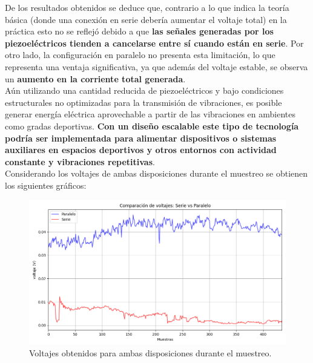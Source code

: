 \documentclass{article}
\begin{document}
De los resultados obtenidos se deduce que, contrario a lo que indica la teoría básica (donde una conexión en serie debería aumentar el voltaje total) en la práctica esto no se reflejó debido a que \textbf{las señales generadas por los piezoeléctricos tienden a cancelarse entre sí cuando están en serie}. Por otro lado, la configuración en paralelo no presenta esta limitación, lo que representa una ventaja significativa, ya que además del voltaje estable, se observa un \textbf{aumento en la corriente total generada}.
\\
Aún utilizando una cantidad reducida de piezoeléctricos y bajo condiciones estructurales no optimizadas para la transmisión de vibraciones, es posible generar energía eléctrica aprovechable a partir de las vibraciones en ambientes como gradas deportivas. \textbf{Con un diseño escalable este tipo de tecnología podría ser implementada para alimentar dispositivos o sistemas auxiliares en espacios deportivos y otros entornos con actividad constante y vibraciones repetitivas}.\\
Considerando los voltajes de ambas disposiciones durante el muestreo se obtienen los siguientes gráficos:
\begin{figure}[H]
    \centering
    \includegraphics[width=0.9\linewidth]{voltajes.png}
    \caption{Voltajes obtenidos para ambas disposiciones durante el muestreo. }
    \label{fig:enter-label}
\end{figure}
\end{document}
